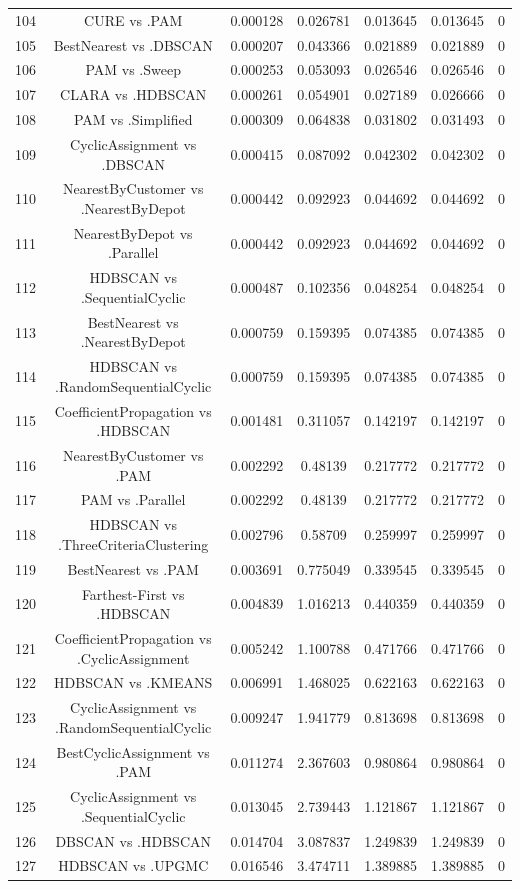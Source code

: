 \documentclass[a4paper,10pt]{article}
\begin{document}
\begin{landscape}
\begin{table}[!htp]
\begin{tabular}{ccccccc}
104&CURE vs .PAM&0.000128&0.026781&0.013645&0.013645&0\\
105&BestNearest vs .DBSCAN&0.000207&0.043366&0.021889&0.021889&0\\
106&PAM vs .Sweep&0.000253&0.053093&0.026546&0.026546&0\\
107&CLARA vs .HDBSCAN&0.000261&0.054901&0.027189&0.026666&0\\
108&PAM vs .Simplified&0.000309&0.064838&0.031802&0.031493&0\\
109&CyclicAssignment vs .DBSCAN&0.000415&0.087092&0.042302&0.042302&0\\
110&NearestByCustomer vs .NearestByDepot&0.000442&0.092923&0.044692&0.044692&0\\
111&NearestByDepot vs .Parallel&0.000442&0.092923&0.044692&0.044692&0\\
112&HDBSCAN vs .SequentialCyclic&0.000487&0.102356&0.048254&0.048254&0\\
113&BestNearest vs .NearestByDepot&0.000759&0.159395&0.074385&0.074385&0\\
114&HDBSCAN vs .RandomSequentialCyclic&0.000759&0.159395&0.074385&0.074385&0\\
115&CoefficientPropagation vs .HDBSCAN&0.001481&0.311057&0.142197&0.142197&0\\
116&NearestByCustomer vs .PAM&0.002292&0.48139&0.217772&0.217772&0\\
117&PAM vs .Parallel&0.002292&0.48139&0.217772&0.217772&0\\
118&HDBSCAN vs .ThreeCriteriaClustering&0.002796&0.58709&0.259997&0.259997&0\\
119&BestNearest vs .PAM&0.003691&0.775049&0.339545&0.339545&0\\
120&Farthest-First vs .HDBSCAN&0.004839&1.016213&0.440359&0.440359&0\\
121&CoefficientPropagation vs .CyclicAssignment&0.005242&1.100788&0.471766&0.471766&0\\
122&HDBSCAN vs .KMEANS&0.006991&1.468025&0.622163&0.622163&0\\
123&CyclicAssignment vs .RandomSequentialCyclic&0.009247&1.941779&0.813698&0.813698&0\\
124&BestCyclicAssignment vs .PAM&0.011274&2.367603&0.980864&0.980864&0\\
125&CyclicAssignment vs .SequentialCyclic&0.013045&2.739443&1.121867&1.121867&0\\
126&DBSCAN vs .HDBSCAN&0.014704&3.087837&1.249839&1.249839&0\\
127&HDBSCAN vs .UPGMC&0.016546&3.474711&1.389885&1.389885&0\\

\end{tabular}
\end{table}
\end{landscape}
\end{document}
